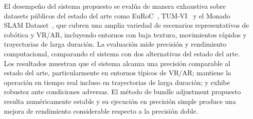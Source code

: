 El desempeño del sistema propuesto se evalúa de manera exhaustiva sobre datasets públicos del estado del arte como EuRoC~\cite{burri2016euroc}, TUM-VI~\cite{schubert2018tum} y el Monado SLAM Dataset~\cite{demayo2025monadoslamdataset}, que cubren una amplia variedad de escenarios representativos de robótica y VR/AR, incluyendo entornos con baja textura, movimientos rápidos y trayectorias de larga duración. La evaluación mide precisión y rendimiento computacional, comparando el sistema con dos alternativas del estado del arte. Los resultados muestran que el sistema alcanza una precisión comparable al estado del arte, particularmente en entornos típicos de VR/AR; mantiene la operación en tiempo real incluso en trayectorias de larga duración; y exhibe robustez ante condiciones adversas. El método de bundle adjustment propuesto resulta numéricamente estable y su ejecución en precisión simple produce una mejora de rendimiento considerable respecto a la precisión doble.

